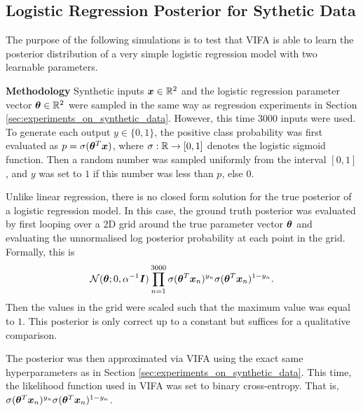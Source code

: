\documentclass[10pt]{article} %
\begin{document}
\subsection{Logistic Regression Posterior for Sythetic Data}
\label{app:results_of_logistic_regression_posterior_for_sythetic_data}
The purpose of the following simulations is to test that VIFA is able to learn the posterior distribution of a very simple logistic regression model with two learnable parameters.

\textbf{Methodology} Synthetic inputs ${\bm{x}} \in \mathbb{R}^2$ and the logistic regression parameter vector ${\bm{\theta}} \in \mathbb{R}^2$ were sampled in the same way as regression experiments in Section \ref{sec:experiments_on_synthetic_data}. However, this time $3000$ inputs were used. To generate each output $y \in \{0, 1\}$, the positive class probability was first evaluated as $p = \sigma({\bm{\theta}}^T {\bm{x}})$, where $\sigma: \mathbb{R} \rightarrow [0,1]$ denotes the logistic sigmoid function. Then a random number was sampled uniformly from the interval $[0, 1]$, and $y$ was set to $1$ if this number was less than $p$, else $0$.

Unlike linear regression, there is no closed form solution for the true posterior of a logistic regression model. In this case, the ground truth posterior was evaluated by first looping over a 2D grid around the true parameter vector ${\bm{\theta}}$ and evaluating the unnormalised log posterior probability at each point in the grid. Formally, this is
\begin{equation}
	\mathcal{N} ( {\bm{\theta}} ; 0, \alpha^{-1} {\bm{I}}) \prod_{n=1}^{3000} \sigma({\bm{\theta}}^T {\bm{x}}_n)^{y_n} \sigma({\bm{\theta}}^T {\bm{x}}_n)^{1 - y_n}.
\end{equation}
Then the values in the grid were scaled such that the maximum value was equal to $1$. This posterior is only correct up to a constant but suffices for a qualitative comparison.

The posterior was then approximated via VIFA using the exact same hyperparameters as in Section \ref{sec:experiments_on_synthetic_data}. This time, the likelihood function used in VIFA was set to binary cross-entropy. That is, $\sigma({\bm{\theta}}^T {\bm{x}}_n)^{y_n} \sigma({\bm{\theta}}^T {\bm{x}}_n)^{1 - y_n}$.
\end{document}
